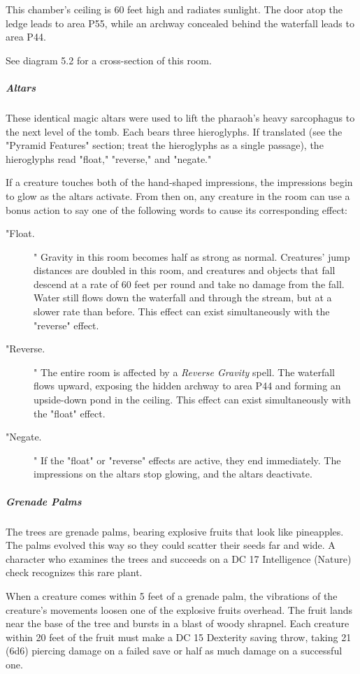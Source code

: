 \documentclass[10pt,a4paper,twoside,bg=print,twocolumn,openany,nodeprecatedcode]{dndbook}
\begin{document}
This chamber's ceiling is 60 feet high and radiates sunlight. The door atop the ledge leads to area P55, while an archway concealed behind the waterfall leads to area P44.

See diagram 5.2 for a cross-section of this room.

\subparagraph{Altars}
These identical magic altars were used to lift the pharaoh's heavy sarcophagus to the next level of the tomb. Each bears three hieroglyphs. If translated (see the "Pyramid Features" section; treat the hieroglyphs as a single passage), the hieroglyphs read "float," "reverse," and "negate."

If a creature touches both of the hand-shaped impressions, the impressions begin to glow as the altars activate. From then on, any creature in the room can use a bonus action to say one of the following words to cause its corresponding effect:


\begin{description}
\item["Float.]
" Gravity in this room becomes half as strong as normal. Creatures' jump distances are doubled in this room, and creatures and objects that fall descend at a rate of 60 feet per round and take no damage from the fall. Water still flows down the waterfall and through the stream, but at a slower rate than before. This effect can exist simultaneously with the "reverse" effect.
\item["Reverse.]
" The entire room is affected by a \textit{Reverse Gravity} spell. The waterfall flows upward, exposing the hidden archway to area P44 and forming an upside-down pond in the ceiling. This effect can exist simultaneously with the "float" effect.
\item["Negate.]
" If the "float" or "reverse" effects are active, they end immediately. The impressions on the altars stop glowing, and the altars deactivate.
\end{description}

\subparagraph{Grenade Palms}
The trees are grenade palms, bearing explosive fruits that look like pineapples. The palms evolved this way so they could scatter their seeds far and wide. A character who examines the trees and succeeds on a DC 17 Intelligence (Nature) check recognizes this rare plant.

When a creature comes within 5 feet of a grenade palm, the vibrations of the creature's movements loosen one of the explosive fruits overhead. The fruit lands near the base of the tree and bursts in a blast of woody shrapnel. Each creature within 20 feet of the fruit must make a DC 15 Dexterity saving throw, taking 21 (6d6) piercing damage on a failed save or half as much damage on a successful one.
\end{document}
